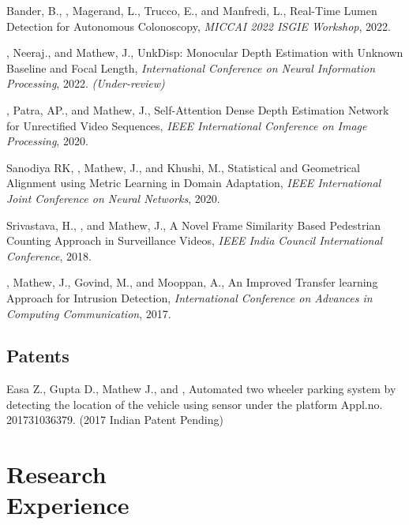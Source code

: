 \documentclass[mm]{simple_style}
\begin{document}
\begin{resume}
Bander, B., , Magerand, L., Trucco, E., and Manfredi, L., Real-Time Lumen Detection for Autonomous Colonoscopy, \textit{MICCAI 2022 ISGIE Workshop}, 2022.

, Neeraj., and Mathew, J., UnkDisp: Monocular Depth Estimation with
Unknown Baseline and Focal Length, \textit{International Conference on Neural Information Processing}, 2022. \textit{(Under-review)}

, Patra, AP., and Mathew, J., Self-Attention Dense Depth Estimation Network for Unrectified Video Sequences, \textit{IEEE International Conference on Image Processing}, 2020.

Sanodiya RK, , Mathew, J., and Khushi, M., Statistical and Geometrical Alignment using Metric Learning in Domain Adaptation, \textit{IEEE International Joint Conference on Neural Networks}, 2020.

Srivastava, H., , and Mathew, J., A Novel Frame Similarity Based Pedestrian Counting Approach in Surveillance Videos, \textit{IEEE India Council International Conference}, 2018.

, Mathew, J., Govind, M., and Mooppan, A., An Improved Transfer learning Approach for Intrusion Detection, \textit{International Conference on Advances in Computing  Communication}, 2017.\\
\halfsectionline
\vspace{-12mm}
\subsection{Patents}
\vspace{-2ex}

Easa Z., Gupta D., Mathew J., and , Automated two wheeler parking system by detecting the location of the vehicle using sensor under the platform Appl.no. 201731036379. (2017 Indian Patent Pending)

\vspace{-2ex}
\sectionline


\section{Research\\Experience}


\end{resume}
\end{document}
